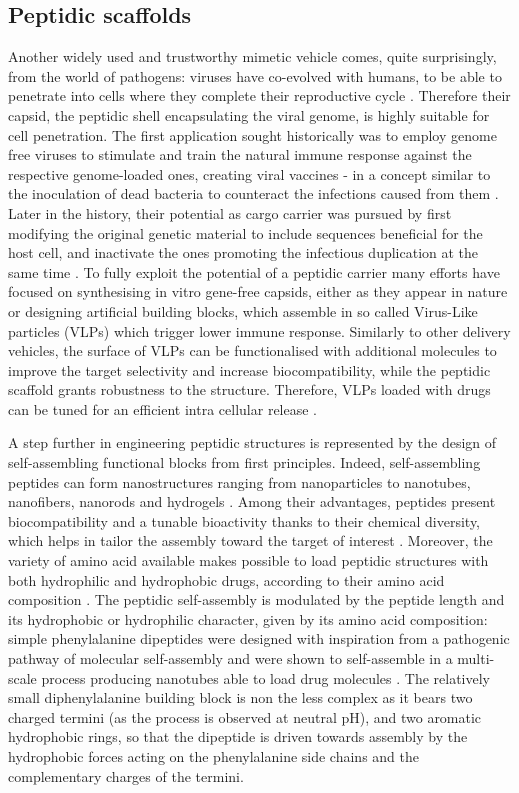 \subsection{Peptidic scaffolds} Another widely used and trustworthy mimetic vehicle comes, quite surprisingly, from the world of pathogens: viruses have co-evolved with humans, to be able to penetrate into cells where they complete their reproductive cycle \citep{Lobo2009}. Therefore their capsid, the peptidic shell encapsulating the viral genome, is highly suitable for cell penetration. The first application sought historically was to employ genome free viruses to stimulate and train the natural immune response against the respective genome-loaded ones, creating viral vaccines - in a concept similar to the inoculation of dead bacteria to counteract the infections caused from them \citep{Lauer2017}.
Later in the history, their potential as cargo carrier was pursued by first modifying the original genetic material to include sequences beneficial for the host cell, and inactivate the ones promoting the infectious duplication at the same time \citep{Daya2008}.
%
To fully exploit the potential of a peptidic carrier many efforts have focused on synthesising in vitro gene-free capsids, either as they appear in nature \citep{Wu2009} or designing artificial building blocks, which assemble in so called Virus-Like particles (VLPs) which trigger lower immune response.
%
Similarly to other delivery vehicles, the surface of VLPs can be functionalised with additional molecules to improve the target selectivity and increase biocompatibility, while the peptidic scaffold grants robustness to the structure. Therefore, VLPs loaded with drugs can be tuned for an efficient intra cellular release \citep{Ma2012}.

A step further in engineering peptidic structures is represented by the design of self-assembling functional blocks from first principles. Indeed, self-assembling peptides can form nanostructures ranging from nanoparticles to nanotubes, nanofibers, nanorods and hydrogels \citep{Fan2017}.
%
Among their advantages, peptides present biocompatibility and a tunable bioactivity thanks to their chemical diversity, which helps in tailor the assembly toward the target of interest \citep{Fan2017}. Moreover, the variety of amino acid available makes possible to load peptidic structures with both hydrophilic and hydrophobic drugs, according to their amino acid composition \citep{Ma2012}.
%
The peptidic self-assembly is modulated by the peptide length and its hydrophobic or hydrophilic character, given by its amino acid composition: simple phenylalanine dipeptides were designed with inspiration from a pathogenic pathway of molecular self-assembly and were shown to self-assemble in a multi-scale process producing nanotubes able to load drug molecules \citep{Silva2013}. The relatively small diphenylalanine building block is non the less complex as it bears two charged termini (as the process is observed at neutral pH), and two aromatic hydrophobic rings, so that the dipeptide is driven towards assembly by the hydrophobic forces acting on the phenylalanine side chains and the complementary charges of the termini.

